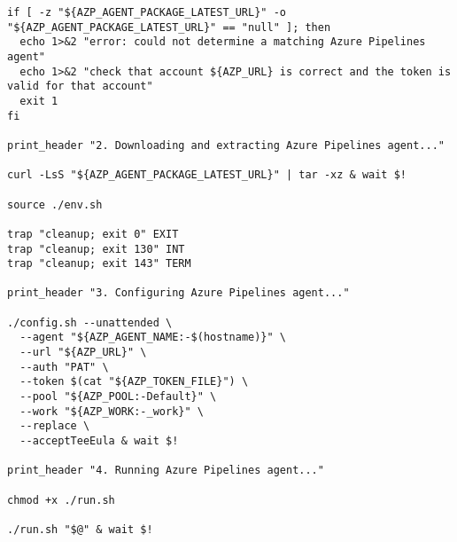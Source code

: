 \begin{Verbatim}[breaklines=true, fontsize=\small]
if [ -z "${AZP_AGENT_PACKAGE_LATEST_URL}" -o "${AZP_AGENT_PACKAGE_LATEST_URL}" == "null" ]; then
  echo 1>&2 "error: could not determine a matching Azure Pipelines agent"
  echo 1>&2 "check that account ${AZP_URL} is correct and the token is valid for that account"
  exit 1
fi

print_header "2. Downloading and extracting Azure Pipelines agent..."

curl -LsS "${AZP_AGENT_PACKAGE_LATEST_URL}" | tar -xz & wait $!

source ./env.sh

trap "cleanup; exit 0" EXIT
trap "cleanup; exit 130" INT
trap "cleanup; exit 143" TERM

print_header "3. Configuring Azure Pipelines agent..."

./config.sh --unattended \
  --agent "${AZP_AGENT_NAME:-$(hostname)}" \
  --url "${AZP_URL}" \
  --auth "PAT" \
  --token $(cat "${AZP_TOKEN_FILE}") \
  --pool "${AZP_POOL:-Default}" \
  --work "${AZP_WORK:-_work}" \
  --replace \
  --acceptTeeEula & wait $!

print_header "4. Running Azure Pipelines agent..."

chmod +x ./run.sh

./run.sh "$@" & wait $!
\end{Verbatim}
